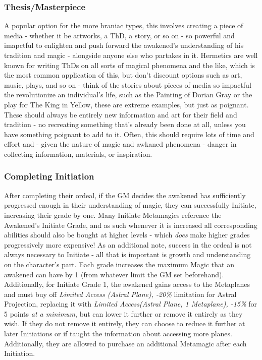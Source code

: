 \begin{multicols*}{3}
	\subsubsection*{Thesis/Masterpiece}
	
	A popular option for the more braniac types, this involves creating a piece of media - whether it be artworks, a ThD, a story, or so on - so powerful and imapctful to enlighten and push forward the awakened's understanding of his tradition and magic - alongside anyone else who partakes in it. Hermetics are well known for writing ThDs on all sorts of magical phenomena and the like, which is the most common application of this, but don't discount options such as art, music, plays, and so on - think of the stories about pieces of media so impactful the revolutionize an individual's life, such as the Painting of Dorian Gray or the play for The King in Yellow, these are extreme examples, but just as poignant. These should always be entirely new information and art for their field and tradition - no recreating something that's already been done at all, unless you have something poignant to add to it. Often, this should require lots of time and effort and - given the nature of magic and awkaned phenomena - danger in collecting information, materials, or inspiration.
	
	\subsubsection*{Completing Initiation}
	
	After completing their ordeal, if the GM decides the awakened has sufficiently progressed enough in their understanding of magic, they can successfully Initiate, increasing their grade by one. Many Initiate Metamagics reference the Awakened's Initiate Grade, and as such whenever it is increased all corresponding abilities should also be bought at higher levels - which \textit{does} make higher grades progressively more expensive! As an additional note, success in the ordeal is not always necessary to Initiate - all that is important is growth and understanding on the character's part. Each grade increases the maximum Magic that an awakened can have by 1 (from whatever limit the GM set beforehand). Additionally, for Initiate Grade 1, the awakened gains access to the Metaplanes and must buy off \textit{Limited Access (Astral Plane), -20\%} limitation for Astral Projection, replacing it with \textit{Limited Access(Astral Plane, 1 Metaplane), -15\%} for 5 points \textit{at a minimum}, but can lower it further or remove it entirely as they wish. If they do not remove it entirely, they can choose to reduce it further at later Initiations or if taught the information about accessing more planes. Additionally, they are allowed to purchase an additional Metamagic after each Initiation.
	

\end{multicols*}
